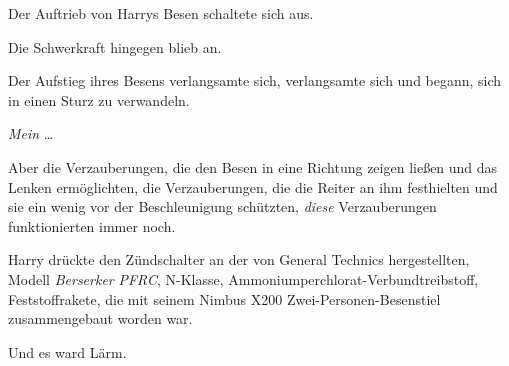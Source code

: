 Der Auftrieb von Harrys Besen schaltete sich aus.

Die Schwerkraft hingegen blieb an.

Der Aufstieg ihres Besens verlangsamte sich, verlangsamte sich und begann, sich in einen Sturz zu verwandeln.

\emph{Mein} …

Aber die Verzauberungen, die den Besen in eine Richtung zeigen ließen und das Lenken ermöglichten, die Verzauberungen, die die Reiter an ihm festhielten und sie ein wenig vor der Beschleunigung schützten, \emph{diese} Verzauberungen funktionierten immer noch.

\emph{}

Harry drückte den Zündschalter an der von General Technics hergestellten, Modell \emph{Berserker} \emph{PFRC}, N-Klasse, Ammoniumperchlorat-Verbundtreibstoff, Feststoffrakete, die mit seinem Nimbus X200 Zwei-Personen-Besenstiel zusammengebaut worden war.

Und es ward Lärm.

